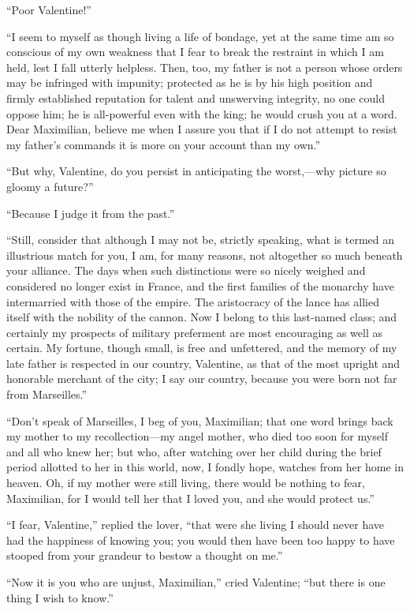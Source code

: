 “Poor Valentine!”

“I seem to myself as though living a life of bondage, yet at the same
time am so conscious of my own weakness that I fear to break the
restraint in which I am held, lest I fall utterly helpless. Then, too,
my father is not a person whose orders may be infringed with impunity;
protected as he is by his high position and firmly established
reputation for talent and unswerving integrity, no one could oppose
him; he is all-powerful even with the king; he would crush you at a
word. Dear Maximilian, believe me when I assure you that if I do not
attempt to resist my father’s commands it is more on your account than
my own.”

“But why, Valentine, do you persist in anticipating the worst,—why
picture so gloomy a future?”

“Because I judge it from the past.”

“Still, consider that although I may not be, strictly speaking, what is
termed an illustrious match for you, I am, for many reasons, not
altogether so much beneath your alliance. The days when such
distinctions were so nicely weighed and considered no longer exist in
France, and the first families of the monarchy have intermarried with
those of the empire. The aristocracy of the lance has allied itself
with the nobility of the cannon. Now I belong to this last-named class;
and certainly my prospects of military preferment are most encouraging
as well as certain. My fortune, though small, is free and unfettered,
and the memory of my late father is respected in our country,
Valentine, as that of the most upright and honorable merchant of the
city; I say our country, because you were born not far from
Marseilles.”

“Don’t speak of Marseilles, I beg of you, Maximilian; that one word
brings back my mother to my recollection—my angel mother, who died too
soon for myself and all who knew her; but who, after watching over her
child during the brief period allotted to her in this world, now, I
fondly hope, watches from her home in heaven. Oh, if my mother were
still living, there would be nothing to fear, Maximilian, for I would
tell her that I loved you, and she would protect us.”

“I fear, Valentine,” replied the lover, “that were she living I should
never have had the happiness of knowing you; you would then have been
too happy to have stooped from your grandeur to bestow a thought on
me.”

“Now it is you who are unjust, Maximilian,” cried Valentine; “but there
is one thing I wish to know.”


